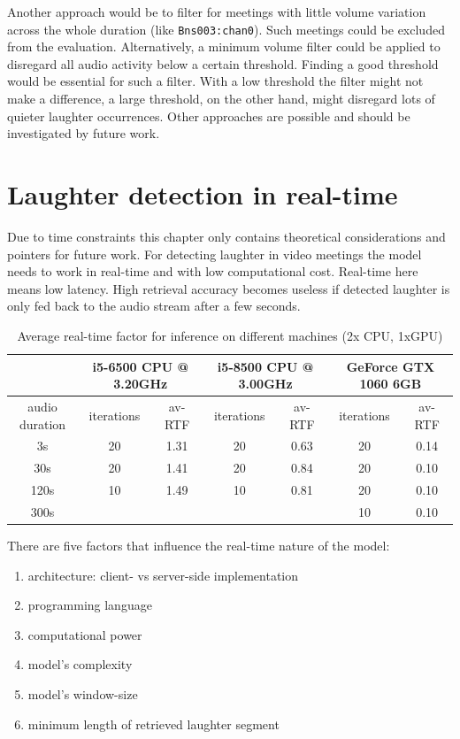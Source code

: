 \documentclass[bsc,frontabs,parskip,deptreport]{infthesis}
\begin{document}
Another approach would be to filter for meetings with little volume variation across the whole duration (like \verb|Bns003:chan0|).
Such meetings could be excluded from the evaluation. 
Alternatively, a minimum volume filter could be applied to disregard all audio activity below a certain threshold.
Finding a good threshold would be essential for such a filter. With a low threshold the filter might not make a difference, a large threshold, on the other hand, might disregard lots of quieter laughter occurrences. 
Other approaches are possible and should be investigated by future work.


\chapter{Laughter detection in real-time} \label{cha:real-time}
Due to time constraints this chapter only contains theoretical considerations and pointers for future work. 
For detecting laughter in video meetings the model needs to work in real-time and with low computational cost. Real-time here means low latency.
High retrieval accuracy becomes useless if detected laughter is only fed back to the audio stream after a few seconds.

\begin{table}[]
    \hspace{-2cm}
    \begin{tabular}{|c|c|c|c|c|c|c|}
    \hline
    & \multicolumn{2}{|c|}{i5-6500 CPU @ 3.20GHz} &
    \multicolumn{2}{|c|}{i5-8500 CPU @ 3.00GHz} & 
    \multicolumn{2}{|c|}{GeForce GTX 1060 6GB} \\ 
    \hline
    audio duration & iterations & av-RTF &
    iterations & av-RTF & iterations & av-RTF \\
    \hline
    3s & 20 & 1.31   & 20 & 0.63  & 20 & 0.14  \\
    30s & 20 & 1.41  & 20 & 0.84  & 20 & 0.10 \\
    120s & 10 & 1.49 &  10 & 0.81  & 20 & 0.10 \\
    300s &&&&                     & 10 & 0.10 \\
    \hline
    \end{tabular}
    \caption{Average real-time factor for inference on different machines (2x CPU, 1xGPU)}
    \label{tab:rtf}
\end{table}


There are five factors that influence the real-time nature of the model:
\begin{enumerate}
    \item architecture: client- vs server-side implementation
    \item programming language
    \item computational power 
    \item model's complexity
    \item model's window-size
    \item minimum length of retrieved laughter segment
\end{enumerate}
\end{document}
